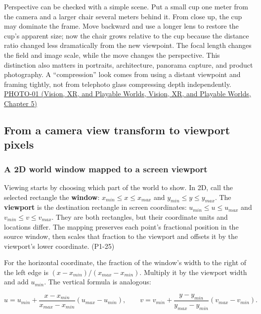 Perspective can be checked with a simple scene. Put a small cup one meter from the camera and a larger chair several meters behind it. From close up, the cup may dominate the frame. Move backward and use a longer lens to restore the cup's apparent size; now the chair grows relative to the cup because the distance ratio changed less dramatically from the new viewpoint. The focal length changes the field and image scale, while the move changes the perspective. This distinction also matters in portraits, architecture, panorama capture, and product photography. A ``compression'' look comes from using a distant viewpoint and framing tightly, not from telephoto glass compressing depth independently. \href{../07-Vision-XR-and-Playable-Worlds/main.pdf\#nameddest=04-visual-computing-ii-ch036-photo-01---photography-session-01}{PHOTO-01 (Vision, XR, and Playable Worlds, Vision, XR, and Playable Worlds, Chapter 5)}

\subsection{From a camera view transform to viewport pixels}\label{03-visual-computing-i-ch003-from-a-camera-view-transform-to-viewport-pixels}

\subsubsection{A 2D world window mapped to a screen viewport}\label{03-visual-computing-i-ch003-a-2d-world-window-mapped-to-a-screen-viewport}

Viewing starts by choosing which part of the world to show. In 2D, call the selected rectangle the \textbf{window}: \(x_{min}\leq x\leq x_{max}\) and \(y_{min}\leq y\leq y_{max}\). The \textbf{viewport} is the destination rectangle in screen coordinates: \(u_{min}\leq u\leq u_{max}\) and \(v_{min}\leq v\leq v_{max}\). They are both rectangles, but their coordinate units and locations differ. The mapping preserves each point's fractional position in the source window, then scales that fraction to the viewport and offsets it by the viewport's lower coordinate. (P1-25)

For the horizontal coordinate, the fraction of the window's width to the right of the left edge is \((x-x_{min})/(x_{max}-x_{min})\). Multiply it by the viewport width and add \(u_{min}\). The vertical formula is analogous:

\[
u=u_{min}+\frac{x-x_{min}}{x_{max}-x_{min}}(u_{max}-u_{min}),\qquad
v=v_{min}+\frac{y-y_{min}}{y_{max}-y_{min}}(v_{max}-v_{min}).
\]

